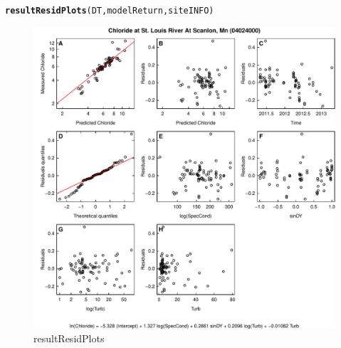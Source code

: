 \documentclass[a4paper,11pt]{article}\usepackage[]{graphicx}\usepackage[]{color}
\makeatletter
\def\maxwidth{ %
  \ifdim\Gin@nat@width>\linewidth
    \linewidth
  \else
    \Gin@nat@width
  \fi
}
\newcommand{\hlstd}[1]{\textcolor[rgb]{0.345,0.345,0.345}{#1}}%
\newcommand{\hlkwd}[1]{\textcolor[rgb]{0.737,0.353,0.396}{\textbf{#1}}}%
\newenvironment{kframe}{%
 \def\at@end@of@kframe{}%
 \ifinner\ifhmode%
  \def\at@end@of@kframe{\end{minipage}}%
  \begin{minipage}{\columnwidth}%
 \fi\fi%
 \def\FrameCommand##1{\hskip\@totalleftmargin \hskip-\fboxsep
 \colorbox{shadecolor}{##1}\hskip-\fboxsep
     \hskip-\linewidth \hskip-\@totalleftmargin \hskip\columnwidth}%
 \MakeFramed {\advance\hsize-\width
   \@totalleftmargin\z@ \linewidth\hsize
   \@setminipage}}%
 {\par\unskip\endMakeFramed%
 \at@end@of@kframe}
\newenvironment{knitrout}{}{} %
\makeatother
\begin{document}
\begin{knitrout}
\color{fgcolor}\begin{kframe}
\begin{alltt}
\hlkwd{resultResidPlots}\hlstd{(DT,modelReturn,siteINFO)}
\end{alltt}
\end{kframe}\begin{figure}[]

\includegraphics[width=\maxwidth]{figure/resultResidPlots} \caption[resultResidPlots]{resultResidPlots\label{fig:resultResidPlots}}
\end{figure}


\end{knitrout}


\FloatBarrier
\end{document}
